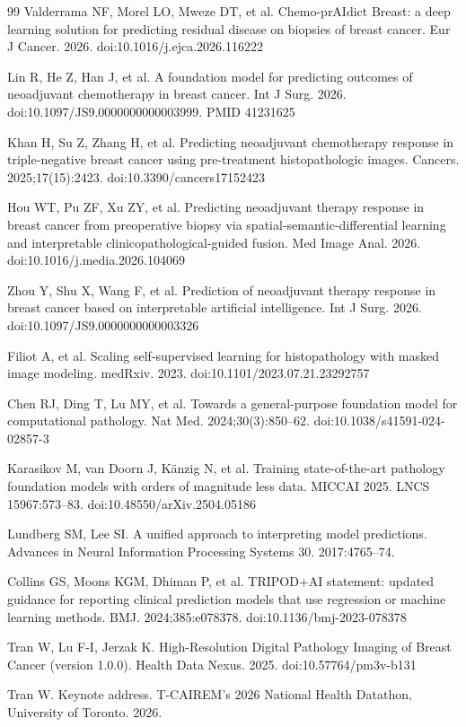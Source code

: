 \documentclass[10pt,a4paper,twocolumn]{article}
\begin{document}
\begin{thebibliography}{99}
 Valderrama NF, Morel LO, Mweze DT, et al. Chemo-prAIdict Breast: a deep learning solution for predicting residual disease on biopsies of breast cancer. Eur J Cancer. 2026. doi:10.1016/j.ejca.2026.116222

 Lin R, He Z, Han J, et al. A foundation model for predicting outcomes of neoadjuvant chemotherapy in breast cancer. Int J Surg. 2026. doi:10.1097/JS9.0000000000003999. PMID 41231625

 Khan H, Su Z, Zhang H, et al. Predicting neoadjuvant chemotherapy response in triple-negative breast cancer using pre-treatment histopathologic images. Cancers. 2025;17(15):2423. doi:10.3390/cancers17152423

 Hou WT, Pu ZF, Xu ZY, et al. Predicting neoadjuvant therapy response in breast cancer from preoperative biopsy via spatial-semantic-differential learning and interpretable clinicopathological-guided fusion. Med Image Anal. 2026. doi:10.1016/j.media.2026.104069

 Zhou Y, Shu X, Wang F, et al. Prediction of neoadjuvant therapy response in breast cancer based on interpretable artificial intelligence. Int J Surg. 2026. doi:10.1097/JS9.0000000000003326

 Filiot A, et al. Scaling self-supervised learning for histopathology with masked image modeling. medRxiv. 2023. doi:10.1101/2023.07.21.23292757

 Chen RJ, Ding T, Lu MY, et al. Towards a general-purpose foundation model for computational pathology. Nat Med. 2024;30(3):850--62. doi:10.1038/s41591-024-02857-3

 Karasikov M, van Doorn J, K{\"a}nzig N, et al. Training state-of-the-art pathology foundation models with orders of magnitude less data. MICCAI 2025. LNCS 15967:573--83. doi:10.48550/arXiv.2504.05186

 Lundberg SM, Lee SI. A unified approach to interpreting model predictions. Advances in Neural Information Processing Systems 30. 2017:4765--74.

 Collins GS, Moons KGM, Dhiman P, et al. TRIPOD+AI statement: updated guidance for reporting clinical prediction models that use regression or machine learning methods. BMJ. 2024;385:e078378. doi:10.1136/bmj-2023-078378

 Tran W, Lu F-I, Jerzak K. High-Resolution Digital Pathology Imaging of Breast Cancer (version 1.0.0). Health Data Nexus. 2025. doi:10.57764/pm3v-b131

 Tran W. Keynote address. T-CAIREM's 2026 National Health Datathon, University of Toronto. 2026.

\end{thebibliography}
\end{document}
